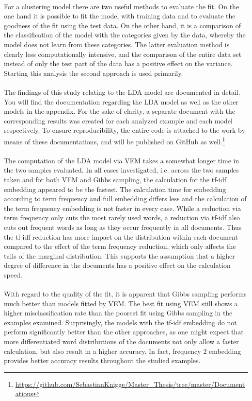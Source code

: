 \documentclass[11pt,a4paper]{article}
\begin{document}
\ \\
For a clustering model there are two useful methods to evaluate the fit. On the one hand it is possible to fit the model with training data and to evaluate the goodness of the fit using the test data. On the other hand, it is a comparison of the classification of the model with the categories given by the data, whereby the model does not learn from these categories. The latter evaluation method is clearly less computationally intensive, and the comparison of the entire data set instead of only the test part of the data has a positive effect on the variance. Starting this analysis the second approach is used primarily.\\
\ \\
The findings of this study relating to the LDA model are documented in detail. You will find the documentation regarding the LDA model as well as the other models in the appendix. For the sake of clarity, a separate document with the corresponding results was created for each analyzed example and each model respectively. To ensure reproducibility, the entire code is attached to the work by means of these documentations, and will be published on GitHub as well.\footnote{\url{https://github.com/SebastianKnigge/Master_Thesis/tree/master/Documentations} }\\
\ \\
The computation of the LDA model via VEM takes a somewhat longer time in the two samples evaluated. In all cases investigated, i.e. across the two samples taken and for both VEM and Gibbs sampling, the calculation for the tf-idf embedding appeared to be the fastest. The calculation time for embedding according to term frequency and full embedding differs less and the calculation of the term frequency embedding is not faster in every case. While a reduction via term frequency only cuts the most rarely used words, a reduction via tf-idf also cuts out frequent words as long as they occur frequently in all documents. Thus the tf-idf reduction has more impact on the distribution within each document compared to the effect of the term frequency reduction, which only affects the tails of the marginal distribution. This supports the assumption that a higher degree of difference in the documents has a positive effect on the calculation speed.\\
\ \\
With regard to the quality of the fit, it is apparent that Gibbs sampling performs much better than models fitted by VEM. The best fit using VEM still shows a higher misclassification rate than the poorest fit using Gibbs sampling in the examples examined. Surprisingly, the models with the tf-idf embedding do not perform significantly better than the other approaches, as one might expect that more differentiated word distributions of the documents not only allow a faster calculation, but also result in a higher accuracy. In fact, frequency 2 embedding provides better accuracy results throughout the studied examples.\\
\end{document}
